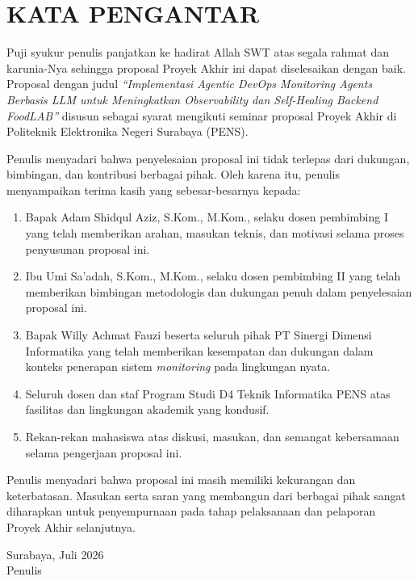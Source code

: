 \cleardoublepage
\chapter*{KATA PENGANTAR}
\thispagestyle{fancy}

Puji syukur penulis panjatkan ke hadirat Allah SWT atas segala rahmat dan karunia-Nya sehingga proposal Proyek Akhir ini dapat diselesaikan dengan baik. Proposal dengan judul \textit{``Implementasi Agentic DevOps Monitoring Agents Berbasis LLM untuk Meningkatkan Observability dan Self-Healing Backend FoodLAB''} disusun sebagai syarat mengikuti seminar proposal Proyek Akhir di Politeknik Elektronika Negeri Surabaya (PENS).

Penulis menyadari bahwa penyelesaian proposal ini tidak terlepas dari dukungan, bimbingan, dan kontribusi berbagai pihak. Oleh karena itu, penulis menyampaikan terima kasih yang sebesar-besarnya kepada:

\begin{enumerate}[label=\arabic*., leftmargin=*]
  \item Bapak Adam Shidqul Aziz, S.Kom., M.Kom., selaku dosen pembimbing I yang telah memberikan arahan, masukan teknis, dan motivasi selama proses penyusunan proposal ini.
  \item Ibu Umi Sa'adah, S.Kom., M.Kom., selaku dosen pembimbing II yang telah memberikan bimbingan metodologis dan dukungan penuh dalam penyelesaian proposal ini.
  \item Bapak Willy Achmat Fauzi beserta seluruh pihak PT Sinergi Dimensi Informatika yang telah memberikan kesempatan dan dukungan dalam konteks penerapan sistem \textit{monitoring} pada lingkungan nyata.
  \item Seluruh dosen dan staf Program Studi D4 Teknik Informatika PENS atas fasilitas dan lingkungan akademik yang kondusif.
  \item Rekan-rekan mahasiswa atas diskusi, masukan, dan semangat kebersamaan selama pengerjaan proposal ini.
\end{enumerate}

Penulis menyadari bahwa proposal ini masih memiliki kekurangan dan keterbatasan. Masukan serta saran yang membangun dari berbagai pihak sangat diharapkan untuk penyempurnaan pada tahap pelaksanaan dan pelaporan Proyek Akhir selanjutnya.

\vspace{1.5cm}
\begin{flushright}
  Surabaya, Juli 2026\\[0.5cm]
  Penulis
\end{flushright}